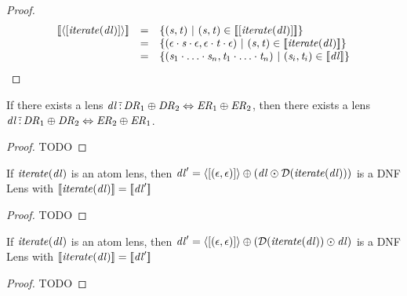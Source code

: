 \documentclass[numbers,10pt,preprint\ifanon ,nocopyrightspace\fi]{sigplanconf}
\begin{document}
\begin{proof}
  \[
    \begin{array}{rcl}
      \SemanticsOf{\DNFLensOf{\SequenceLensOf{\IterateLensOf{\DNFLens}}}}
      & = &
            \SetOf{
            (\String,\StringAlt)
            \SuchThat
            (\String,\StringAlt)\in\SemanticsOf{\SequenceLensOf{\IterateLensOf{\DNFLens}}}}\\
      & = &
            \SetOf{
            (\EmptyString\Concat\String\Concat\EmptyString,\EmptyString\Concat\StringAlt\Concat\EmptyString)
            \SuchThat
            (\String,\StringAlt)\in\SemanticsOf{\IterateLensOf{\DNFLens}}}\\
      & = &
            \SetOf{
            (\String_1\Concat\ldots\Concat\String_n,\StringAlt_1\Concat\ldots\Concat\StringAlt_n)
            \SuchThat
            (\String_i,\StringAlt_i)\in\SemanticsOf{\DNFLens}}
    \end{array}
  \]
\end{proof}

\begin{lemma}
  \label{lem:or-dnf-commutativity}
  If there exists a lens $\mathit{dl} \,\tilde{:}\, \mathit{DR}_1 \oplus \mathit{DR}_2
  \Leftrightarrow \mathit{ER}_1 \oplus \mathit{ER}_2$, then there exists a
  lens
  $\mathit{dl} \,\tilde{:}\, \mathit{DR}_1 \oplus \mathit{DR}_2
  \Leftrightarrow \mathit{ER}_2 \oplus \mathit{ER}_1$.
\end{lemma}
\begin{proof}
  TODO
\end{proof}

\begin{lemma}
  \label{lem:iterate-lens-unroll-left}
  If $\mathit{\mathit{iterate}(\mathit{dl})}$ is an atom lens, then
  $\mathit{dl}' = \langle[(\epsilon,\epsilon)]\rangle \oplus (\mathit{dl}
  \odot \mathcal{D}(\mathit{\mathit{iterate}(\mathit{dl})}))$ is a DNF Lens with
  $[ \! [\mathit{\mathit{iterate}(\mathit{dl})}] \! ] = [ \! [\mathit{dl}'] \! ]$
\end{lemma}
\begin{proof}
  TODO
\end{proof}

\begin{lemma}
  \label{lem:iterate-lens-unroll-right}
  If $\mathit{\mathit{iterate}(\mathit{dl})}$ is an atom lens, then
  $\mathit{dl}' = \langle[(\epsilon,\epsilon)]\rangle \oplus (\mathcal{D}(\mathit{\mathit{iterate}(\mathit{dl})})
  \odot \mathit{dl})$ is a DNF Lens with
  $[ \! [\mathit{\mathit{iterate}(\mathit{dl})}] \! ] = [ \! [\mathit{dl}'] \! ]$
\end{lemma}
\begin{proof}
  TODO
\end{proof}
\end{document}

